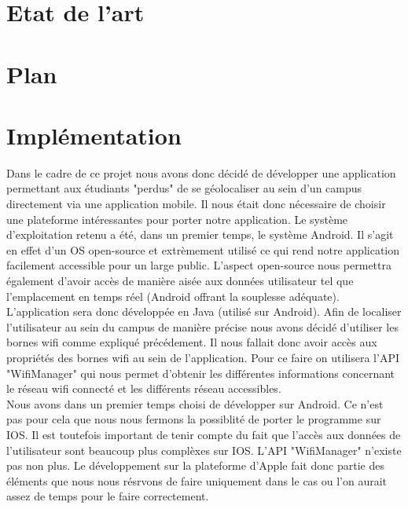 \documentclass[11pt,a4paper]{article}
\begin{document}
\newpage
\section{Etat de l'art}

\section{Plan}

\section{Implémentation}
Dans le cadre de ce projet nous avons donc décidé de développer une application permettant aux étudiants "perdus" de se géolocaliser au sein d'un campus directement via une application mobile. Il nous était donc nécessaire de choisir une plateforme intéressantes pour porter notre application. Le système d'exploitation retenu a été, dans un premier temps, le système Android. Il s'agit en effet d'un OS open-source et extrèmement utilisé ce qui rend notre application facilement accessible pour un large public. L'aspect open-source nous permettra également d'avoir accès de manière aisée aux données utilisateur tel que l'emplacement en temps réel (Android offrant la souplesse adéquate).\\
L'application sera donc développée en Java (utilisé sur Android). Afin de localiser l'utilisateur au sein du campus de manière précise nous avons décidé d'utiliser les bornes wifi comme expliqué précédement. Il nous fallait donc avoir accès aux propriétés des bornes wifi au sein de l'application. Pour ce faire on utilisera l'API "WifiManager" qui nous permet d'obtenir les différentes informations concernant le réseau wifi connecté et les différents réseau accessibles.\\
Nous avons dans un premier temps choisi de développer sur Android. Ce n'est pas pour cela que nous nous fermons la possiblité de porter le programme sur IOS. Il est toutefois important de tenir compte du fait que l'accès aux données de l'utilisateur sont beaucoup plus complèxes sur IOS. L'API "WifiManager" n'existe pas non plus. Le développement sur la plateforme d'Apple fait donc partie des éléments que nous nous résrvons de faire uniquement dans le cas ou l'on aurait assez de temps pour le faire correctement.
\end{document}
